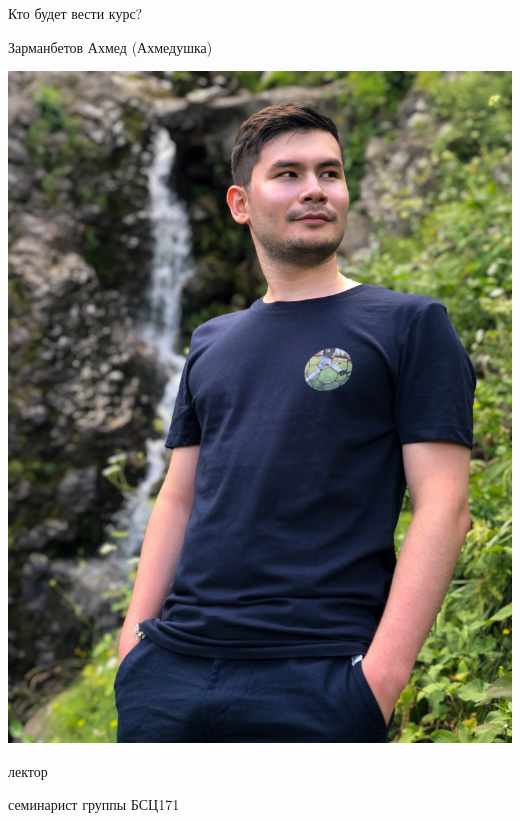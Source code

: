 \documentclass[notes,12pt, aspectratio=169]{beamer}
\newenvironment{wideitemize}{\itemize\addtolength{\itemsep}{10pt}}{\enditemize}
\begin{document}
\begin{frame}{Кто будет вести курс?}
	\begin{minipage}{0.45\textwidth}
		\centering Зарманбетов Ахмед (Ахмедушка)
		
		\centering \includegraphics[scale = 0.2]{ahmed.jpg}
	\end{minipage}
	\hfill
	\begin{minipage}{0.45\textwidth}
		\begin{wideitemize}
			
			\item лектор 
			
			\item семинарист группы БСЦ171

		\end{wideitemize} 
	\end{minipage}
\end{frame}
\end{document}
